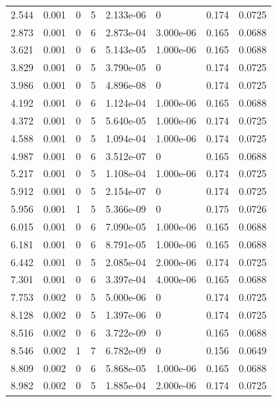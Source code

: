 \documentclass[preview]{standalone}
\begin{document}
{{\begin{tabular}{L{1.2cm}C{1.2cm} C{0.3cm}C{0.5cm} C{1.4cm}C{1.4cm} C{1.4cm}C{1.4cm}}
  2.544  &  0.001  & 0     &  5 &  2.133e-06  & 0  & 0.174 &  0.0725   \\ 
  2.873  &  0.001  & 0     &  6 &  2.873e-04  & 3.000e-06  & 0.165 &  0.0688   \\ 
  3.621  &  0.001  & 0     &  6 &  5.143e-05  & 1.000e-06  & 0.165 &  0.0688   \\ 
  3.829  &  0.001  & 0     &  5 &  3.790e-05  & 0  & 0.174 &  0.0725   \\ 
  3.986  &  0.001  & 0     &  5 &  4.896e-08  & 0  & 0.174 &  0.0725   \\ 
  4.192  &  0.001  & 0     &  6 &  1.124e-04  & 1.000e-06  & 0.165 &  0.0688   \\ 
  4.372  &  0.001  & 0     &  5 &  5.640e-05  & 1.000e-06  & 0.174 &  0.0725   \\ 
  4.588  &  0.001  & 0     &  5 &  1.094e-04  & 1.000e-06  & 0.174 &  0.0725   \\ 
  4.987  &  0.001  & 0     &  6 &  3.512e-07  & 0  & 0.165 &  0.0688   \\ 
  5.217  &  0.001  & 0     &  5 &  1.108e-04  & 1.000e-06  & 0.174 &  0.0725   \\ 
  5.912  &  0.001  & 0     &  5 &  2.154e-07  & 0  & 0.174 &  0.0725   \\ 
  5.956  &  0.001  & 1     &  5 &  5.366e-09  & 0  & 0.175 &  0.0726   \\ 
  6.015  &  0.001  & 0     &  6 &  7.090e-05  & 1.000e-06  & 0.165 &  0.0688   \\ 
  6.181  &  0.001  & 0     &  6 &  8.791e-05  & 1.000e-06  & 0.165 &  0.0688   \\ 
  6.442  &  0.001  & 0     &  5 &  2.085e-04  & 2.000e-06  & 0.174 &  0.0725   \\ 
  7.301  &  0.001  & 0     &  6 &  3.397e-04  & 4.000e-06  & 0.165 &  0.0688   \\ 
  7.753  &  0.002  & 0     &  5 &  5.000e-06  & 0  & 0.174 &  0.0725   \\ 
  8.128  &  0.002  & 0     &  5 &  1.397e-06  & 0  & 0.174 &  0.0725   \\ 
  8.516  &  0.002  & 0     &  6 &  3.722e-09  & 0  & 0.165 &  0.0688   \\ 
  8.546  &  0.002  & 1     &  7 &  6.782e-09  & 0  & 0.156 &  0.0649   \\ 
  8.809  &  0.002  & 0     &  6 &  5.868e-05  & 1.000e-06  & 0.165 &  0.0688   \\ 
  8.982  &  0.002  & 0     &  5 &  1.885e-04  & 2.000e-06  & 0.174 &  0.0725   \\ 

\end{tabular}}}
\end{document}
